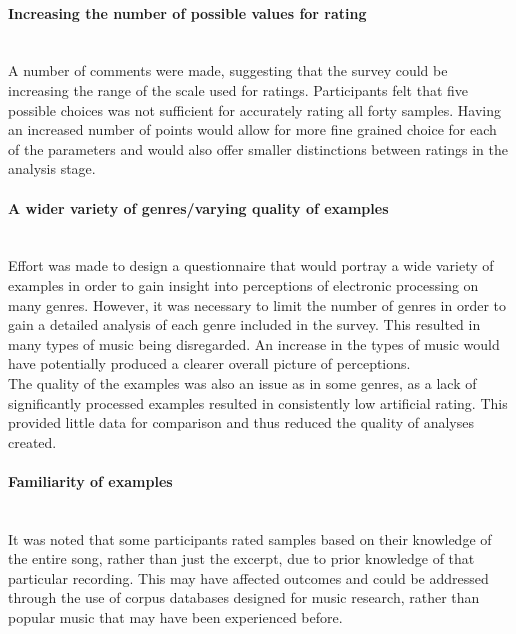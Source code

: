 \documentclass[titlepage]{scrartcl}
\begin{document}
    \paragraph{Increasing the number of possible values for rating}\mbox{}\\
    A number of comments were made, suggesting that the survey could be
    increasing the range of the scale used for ratings. Participants felt that
    five possible choices was not sufficient for accurately rating all forty
    samples. Having an increased number of points would allow for more fine
    grained choice for each of the parameters and would also offer smaller
    distinctions between ratings in the analysis stage. 

    \paragraph{A wider variety of genres/varying quality of examples}\mbox{}\\
    Effort was made to design a questionnaire that would portray a wide variety
    of examples in order to gain insight into perceptions of electronic
    processing on many genres. However, it was necessary to limit the number of
    genres in order to gain a detailed analysis of each genre included in the
    survey. This resulted in many types of music being disregarded. An increase
    in the types of music would have potentially produced a clearer overall
    picture of perceptions.\\ 
    The quality of the examples was also an issue as in some genres, as a lack
    of significantly processed examples resulted in consistently low artificial
    rating. This provided little data for comparison and thus reduced the
    quality of analyses created.

    \paragraph{Familiarity of examples}\mbox{}\\
    It was noted that some participants rated samples based on their knowledge of
    the entire song, rather than just the excerpt, due to prior knowledge of
    that particular recording. This may have affected outcomes and could be
    addressed through the use of corpus databases designed for music research,
    rather than popular music that may have been experienced before.
\end{document}

